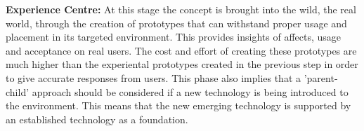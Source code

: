 \textbf{Experience Centre:}
At this stage the concept is brought into the wild, the real world, through the creation of prototypes that can withstand proper usage and placement in its targeted environment. This provides insights of affects, usage and acceptance on real users. The cost and effort of creating these prototypes are much higher than the experiental prototypes created in the previous step in order to give accurate responses from users. This phase also implies that a 'parent-child' approach should be considered if a new technology is being introduced to the environment. This means that the new emerging technology is supported by an established technology as a foundation.
